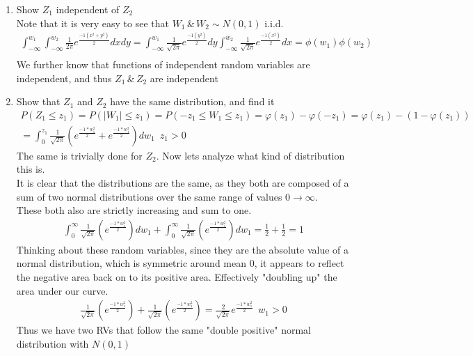 \documentclass[11pt]{article}
\begin{document}
\begin{enumerate}
\begin{enumerate}
	\item Show $Z_1$ independent of $Z_2$
	\\
	Note that it is very easy to see that $W_1 \, \& \, W_2 \sim N(0,1)$ i.i.d.
	\begin{gather}
		\int_{-\infty}^{w_1}\int_{-\infty}^{w_2} \frac{1}{2\pi}e^{\frac{-1(x^2+y^2)}{2}}dxdy = \int_{-\infty}^{w_1}\frac{1}{\sqrt{2\pi}}e^{\frac{-1(y^2)}{2}}dy\int_{-\infty}^{w_2} \frac{1}{\sqrt{2\pi}}e^{\frac{-1(x^2)}{2}}dx =\phi(w_1)\phi(w_2)\\
	\end{gather}
	We further know that functions of independent random variables are independent, and thus $Z_1 \, \& \, Z_2$ are independent
	\item Show that $Z_1$ and $Z_2$ have the same distribution, and find it
	\begin{gather}
		P(Z_1\le z_1) = P(|W_1|\le z_1) = P( -z_1 \le W_1 \le z_1) = \varphi(z_1) - \varphi(-z_1) = \varphi(z_1) - (1- \varphi(z_1))\\
		= \int_{0}^{z_1}\frac{1}{\sqrt{2\pi}}(e^\frac{-1*w_1^2}{2} + e^\frac{-1*w_1^2}{2})dw_1 \, \, \, z_1>0
	\end{gather}
	The same is trivially done for $Z_2$. Now lets analyze what kind of distribution this is.\\
	It is clear that the distributions are the same, as they both are composed of a sum of two normal distributions over the same range of values $0 \rightarrow \infty$.\\
	These both also are strictly increasing and sum to one.\\
	\begin{gather}
		\int_{0}^{\infty}\frac{1}{\sqrt{2\pi}}(e^\frac{-1*w_1^2}{2})dw_1 + \int_{0}^{\infty}\frac{1}{\sqrt{2\pi}}(e^\frac{-1*w_1^2}{2})dw_1 = \frac{1}{2} + \frac{1}{2} = 1
	\end{gather} Thinking about these random variables, since they are the absolute value of a normal distribution, which is symmetric around mean 0, it appears to reflect the negative area back on to its positive area. Effectively "doubling up" the area under our curve.
	\begin{gather}
	\frac{1}{\sqrt{2\pi}}(e^\frac{-1*w_1^2}{2}) + \frac{1}{\sqrt{2\pi}}(e^\frac{-1*w_1^2}{2}) =
		\frac{2}{\sqrt{2\pi}} e^\frac{-1*w_1^2}{2} \, \, \, w_1>0
	\end{gather}
	Thus we have two RVs that follow the same "double positive" normal distribution with $N(0,1)$
\end{enumerate}
\end{enumerate}
\end{document}
